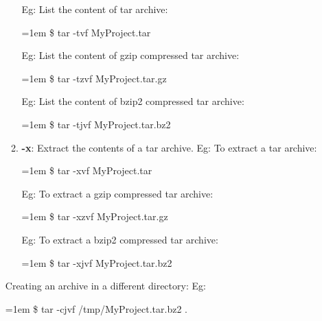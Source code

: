 \begin{flushleft}
\begin{itemize}
\begin{enumerate}
		\newline
		Eg: List the content of tar archive:
		\begin{tcolorbox}[breakable,notitle,boxrule=-0pt,colback=black,colframe=black]
			\color{green}
			\font=1em
			\$ tar -tvf MyProject.tar
			\font=4pt
		\end{tcolorbox}		
		Eg: List the content of gzip compressed tar archive:
		\begin{tcolorbox}[breakable,notitle,boxrule=-0pt,colback=black,colframe=black]
			\color{green}
			\font=1em
			\$ tar -tzvf MyProject.tar.gz
			\font=4pt
		\end{tcolorbox}		
		Eg: List the content of bzip2 compressed tar archive:
		\begin{tcolorbox}[breakable,notitle,boxrule=-0pt,colback=black,colframe=black]
			\color{green}
			\font=1em
			\$ tar -tjvf MyProject.tar.bz2
			\font=4pt
		\end{tcolorbox}		
		\item \textbf{-x}: Extract the contents of a tar archive.
		\newline
		Eg: To extract a tar archive:
		\begin{tcolorbox}[breakable,notitle,boxrule=-0pt,colback=black,colframe=black]
			\color{green}
			\font=1em
			\$ tar -xvf MyProject.tar
			\font=4pt
		\end{tcolorbox}		
		Eg: To extract a gzip compressed tar archive:
		\begin{tcolorbox}[breakable,notitle,boxrule=-0pt,colback=black,colframe=black]
			\color{green}
			\font=1em
			\$ tar -xzvf MyProject.tar.gz
			\font=4pt
		\end{tcolorbox}		
		Eg: To extract a bzip2 compressed tar archive:
		\begin{tcolorbox}[breakable,notitle,boxrule=-0pt,colback=black,colframe=black]
			\color{green}
			\font=1em
			\$ tar -xjvf MyProject.tar.bz2
			\font=4pt
		\end{tcolorbox}		
	\end{enumerate}
	\bigskip
	Creating an archive in a different directory:
		Eg:
	\begin{tcolorbox}[breakable,notitle,boxrule=-0pt,colback=black,colframe=black]
		\color{green}
		\font=1em
		\$ tar -cjvf /tmp/MyProject.tar.bz2  .
		\font=4pt
	\end{tcolorbox}		
	
	
	
		
		
		
	\end{itemize} 
	
\end{flushleft}

\newpage

